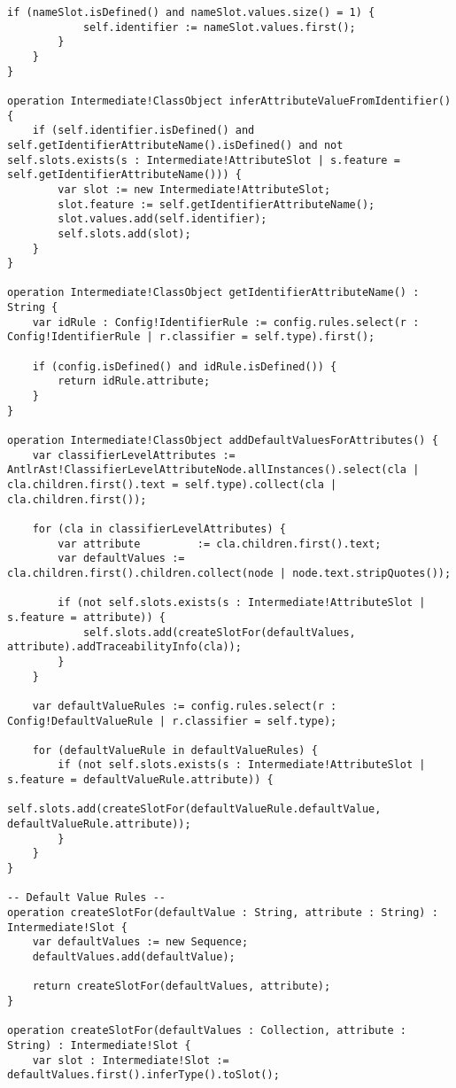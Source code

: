 \begin{lstlisting}[caption=Transforming AST models to intermediate models with ETL., label=lst:m2m_full, language=ETL]
		if (nameSlot.isDefined() and nameSlot.values.size() = 1) {
			self.identifier := nameSlot.values.first();
		} 
	}
}

operation Intermediate!ClassObject inferAttributeValueFromIdentifier() {
	if (self.identifier.isDefined() and self.getIdentifierAttributeName().isDefined() and not self.slots.exists(s : Intermediate!AttributeSlot | s.feature = self.getIdentifierAttributeName())) {
		var slot := new Intermediate!AttributeSlot;
		slot.feature := self.getIdentifierAttributeName();
		slot.values.add(self.identifier);
		self.slots.add(slot);
	}
}

operation Intermediate!ClassObject getIdentifierAttributeName() : String {
	var idRule : Config!IdentifierRule := config.rules.select(r : Config!IdentifierRule | r.classifier = self.type).first();

	if (config.isDefined() and idRule.isDefined()) {
		return idRule.attribute;
	} 
}

operation Intermediate!ClassObject addDefaultValuesForAttributes() {
	var classifierLevelAttributes := AntlrAst!ClassifierLevelAttributeNode.allInstances().select(cla | cla.children.first().text = self.type).collect(cla | cla.children.first());
	
	for (cla in classifierLevelAttributes) {
		var attribute         := cla.children.first().text;
		var defaultValues := cla.children.first().children.collect(node | node.text.stripQuotes());
	
		if (not self.slots.exists(s : Intermediate!AttributeSlot | s.feature = attribute)) {
			self.slots.add(createSlotFor(defaultValues, attribute).addTraceabilityInfo(cla));
		}
	}
	
	var defaultValueRules := config.rules.select(r : Config!DefaultValueRule | r.classifier = self.type);
	
	for (defaultValueRule in defaultValueRules) {
		if (not self.slots.exists(s : Intermediate!AttributeSlot | s.feature = defaultValueRule.attribute)) {
			self.slots.add(createSlotFor(defaultValueRule.defaultValue, defaultValueRule.attribute));
		}
	}
}

-- Default Value Rules --
operation createSlotFor(defaultValue : String, attribute : String) : Intermediate!Slot {
	var defaultValues := new Sequence;
	defaultValues.add(defaultValue);
	
	return createSlotFor(defaultValues, attribute);
}

operation createSlotFor(defaultValues : Collection, attribute : String) : Intermediate!Slot {
	var slot : Intermediate!Slot := defaultValues.first().inferType().toSlot();


\end{lstlisting}
